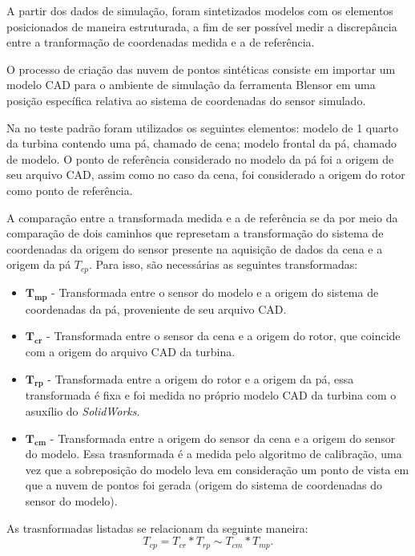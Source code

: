 A partir dos dados de simulação, foram sintetizados modelos com os elementos
posicionados de maneira estruturada, a fim de ser possível medir a discrepância
entre a tranformação de coordenadas medida e a de referência. 

O processo de criação das nuvem de pontos sintéticas consiste em importar um
modelo CAD para o ambiente de simulação da ferramenta Blensor em uma posição
específica relativa ao sistema de coordenadas do sensor simulado. 

Na no teste padrão foram utilizados os seguintes elementos: modelo de 1 quarto
da turbina contendo uma pá, chamado de cena; modelo frontal da pá, chamado de
modelo. O ponto de referência considerado no modelo da pá foi a origem de seu
arquivo CAD, assim como no caso da cena, foi considerado a origem do rotor como
ponto de referência.

A comparação entre a transformada medida e a de referência se da por meio da
comparação de dois caminhos que represetam a transformação do sistema de
coordenadas da origem do sensor presente na aquisição de dados da cena e a
origem da pá $T_{cp}$.  Para isso, são necessárias as seguintes transformadas:

\begin{itemize}
  \item $\mathbf{T_{mp}}$ - Transformada entre o sensor do modelo e a
  origem do sistema de coordenadas da pá, proveniente de seu arquivo CAD.
  \item $\mathbf{T_{cr}}$ - Transformada entre o sensor da cena e a origem do
  rotor, que coincide com a origem do arquivo CAD da turbina.
  \item $\mathbf{T_{rp}}$ - Transformada entre a origem do rotor e a origem da
  pá, essa transformada é fixa e foi medida no próprio modelo CAD da turbina com
  o asuxílio do \textit{SolidWorks}.
  \item $\mathbf{T_{cm}}$ - Transformada entre a origem do sensor da cena e a
  origem do sensor do modelo. Essa trasnformada é a medida pelo algoritmo de
  calibração, uma vez que a sobreposição do modelo leva em consideração um ponto
  de vista em que a nuvem de pontos foi gerada (origem do sistema de
  coordenadas do sensor do modelo).
\end{itemize}

As trasnformadas listadas se relacionam da seguinte maneira:
\begin{equation}
T_{cp} = T_{cr}*T_{rp} \sim T_{cm}*T_{mp}.
\label{eq::tfs}
\end{equation}


